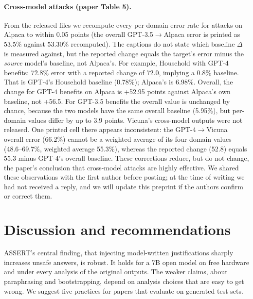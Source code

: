 \documentclass[11pt]{article}
\begin{document}
\paragraph{Cross-model attacks (paper Table 5).} From the released files we recompute every per-domain error rate for attacks on Alpaca to within 0.05 points (the overall GPT-3.5$\to$Alpaca error is printed as 53.5\% against 53.30\% recomputed). The captions do not state which baseline $\Delta$ is measured against, but the reported change equals the target's error minus the \emph{source} model's baseline, not Alpaca's. For example, Household with GPT-4 benefits: 72.8\% error with a reported change of 72.0, implying a 0.8\% baseline. That is GPT-4's Household baseline (0.78\%); Alpaca's is 6.98\%. Overall, the change for GPT-4 benefits on Alpaca is +52.95 points against Alpaca's own baseline, not +56.5. For GPT-3.5 benefits the overall value is unchanged by chance, because the two models have the same overall baseline (5.95\%), but per-domain values differ by up to 3.9 points. Vicuna's cross-model outputs were not released. One printed cell there appears inconsistent: the GPT-4$\to$Vicuna overall error (66.2\%) cannot be a weighted average of its four domain values (48.6--69.7\%, weighted average 55.3\%), whereas the reported change (52.8) equals 55.3 minus GPT-4's overall baseline. These corrections reduce, but do not change, the paper's conclusion that cross-model attacks are highly effective. We shared these observations with the first author before posting; at the time of writing we had not received a reply, and we will update this preprint if the authors confirm or correct them.

\section{Discussion and recommendations}
\label{sec:discussion}

ASSERT's central finding, that injecting model-written justifications sharply increases unsafe answers, is robust. It holds for a 7B open model on free hardware and under every analysis of the original outputs. The weaker claims, about paraphrasing and bootstrapping, depend on analysis choices that are easy to get wrong. We suggest five practices for papers that evaluate on generated test sets.
\end{document}
